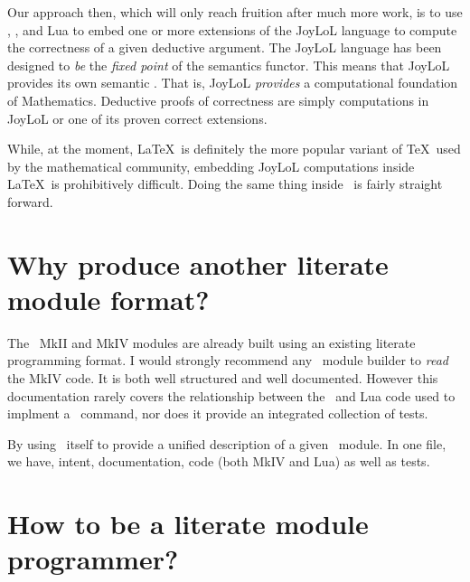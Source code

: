 Our approach then, which will only reach fruition after much more work, is 
to use \ConTeXt, \LuaTeX, and Lua to embed one or more extensions of the 
JoyLoL language to compute the correctness of a given deductive argument. 
The JoyLoL language has been designed to \emph{be} the \emph{fixed point} 
of the semantics functor. This means that JoyLoL provides its own semantic 
. That is, JoyLoL \emph{provides} a computational 
foundation of Mathematics. Deductive proofs of correctness are simply 
computations in JoyLoL or one of its proven correct extensions. 

While, at the moment, \LaTeX\ is definitely the more popular variant of 
\TeX\ used by the mathematical community, embedding JoyLoL computations 
inside \LaTeX\ is prohibitively difficult. Doing the same thing inside 
\ConTeXt\ is fairly straight forward. 

\section{Why produce another literate module format?} 

The \ConTeXt\ MkII and MkIV modules are already built using an existing 
literate programming format. I would strongly recommend any \ConTeXt\ 
module builder to \emph{read} the MkIV code. It is both well structured 
and well documented. However this documentation rarely covers the 
relationship between the \LuaTeX\ and Lua code used to implment a 
\ConTeXt\ command, nor does it provide an integrated collection of tests.

By using \ConTeXt\ itself to provide a unified description of a given 
\ConTeXt\ module. In one file, we have, intent, documentation, code (both 
MkIV and Lua) as well as tests. 

\section{How to be a literate module programmer?} 

\stopchapter 

